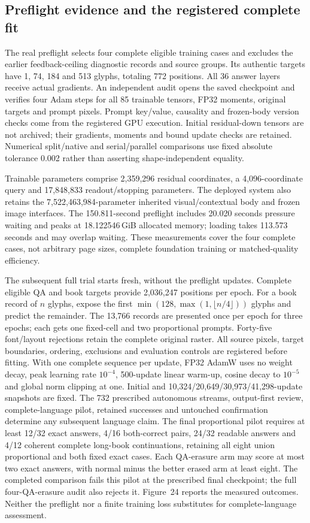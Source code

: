 \documentclass[12pt,a4paper]{article}
\providecommand{\DIFadd}[1]{{\protect\color{blue} \sf #1}} %
\begin{document}
\subsection*{\DIFadd{Preflight evidence and the registered complete fit}}
\DIFadd{The real preflight selects four complete eligible training cases and excludes
the earlier feedback-ceiling diagnostic records and source groups. Its authentic
targets have 1, 74, 184 and 513 glyphs, totaling 772 positions. All 36 answer
layers receive actual gradients. An independent audit opens the saved checkpoint
and verifies four Adam steps for all 85 trainable tensors, FP32 moments,
original targets and prompt pixels. Prompt key/value, causality and frozen-body
version checks come from the registered GPU execution. Initial residual-down
tensors are not archived; their gradients, moments and bound update checks
are retained. Numerical split/native and serial/parallel comparisons use fixed
absolute tolerance 0.002 rather than asserting shape-independent equality.
}

\DIFadd{Trainable parameters comprise 2,359,296 residual coordinates, a 4,096-coordinate
query and 17,848,833 readout/stopping parameters. The deployed system also retains
the 7,522,463,984-parameter inherited visual/contextual body and frozen image
interfaces. The 150.811-second preflight includes 20.020 seconds pressure waiting
and peaks at 18.122546\,GiB allocated memory; loading takes 113.573 seconds and
may overlap waiting. These measurements cover the four complete cases, not
arbitrary page sizes, complete foundation training or matched-quality efficiency.
}

\DIFadd{The subsequent full trial starts fresh, without the preflight updates. Complete
eligible QA and book targets provide 2,036,247 positions per epoch. For a book
record of $n$ glyphs, expose the first
$\min(128,\max(1,\lfloor n/4\rfloor))$ glyphs and predict
the remainder. The 13,766 records are presented once per epoch for three epochs;
each gets one fixed-cell and two proportional prompts. Forty-five font/layout
rejections retain the complete original raster. All source pixels, target
boundaries, ordering, exclusions and evaluation controls are registered before
fitting. With one complete sequence per update, FP32 AdamW uses no weight decay,
peak learning rate $10^{-4}$, 500-update linear warm-up, cosine decay to $10^{-5}$
and global norm clipping at one. Initial and 10,324/20,649/30,973/41,298-update
snapshots are fixed. The 732 prescribed autonomous streams, output-first review,
complete-language pilot, retained successes and untouched confirmation determine
any subsequent language claim. The final proportional pilot requires at least
12/32 exact answers, 4/16 both-correct pairs, 24/32 readable answers and 4/12
coherent complete long-book continuations, retaining all eight union proportional
and both fixed exact cases. Each QA-erasure arm may score at most two exact
answers, with normal minus the better erased arm at least eight. The completed
comparison fails this pilot at the prescribed final checkpoint; the full
four-QA-erasure audit also rejects it. Figure~24
reports the measured outcomes. Neither the preflight nor a finite training
loss substitutes for complete-language assessment.
}
\end{document}
